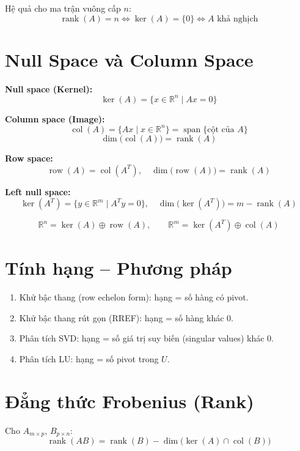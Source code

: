 Hệ quả cho ma trận vuông cấp $n$:
\[
\operatorname{rank}(A) = n \iff \ker(A) = \{0\} \iff A \text{ khả nghịch}
\]

\section{Null Space và Column Space}

\textbf{Null space (Kernel):}
\[
\ker(A) = \{x \in \mathbb{R}^n \mid Ax = 0\}
\]

\textbf{Column space (Image):}
\[
\operatorname{col}(A) = \{Ax \mid x \in \mathbb{R}^n\} = \operatorname{span}\{\text{cột của } A\}
\]
\[
\dim\bigl(\operatorname{col}(A)\bigr) = \operatorname{rank}(A)
\]

\textbf{Row space:}
\[
\operatorname{row}(A) = \operatorname{col}(A^T), \quad \dim\bigl(\operatorname{row}(A)\bigr) = \operatorname{rank}(A)
\]

\textbf{Left null space:}
\[
\ker(A^T) = \{y \in \mathbb{R}^m \mid A^T y = 0\}, \quad \dim\bigl(\ker(A^T)\bigr) = m - \operatorname{rank}(A)
\]

\[
\mathbb{R}^n = \ker(A) \oplus \operatorname{row}(A), \qquad
\mathbb{R}^m = \ker(A^T) \oplus \operatorname{col}(A)
\]

\section{Tính hạng -- Phương pháp}

\begin{enumerate}
    \item Khử bậc thang (row echelon form): hạng = số hàng có pivot.
    \item Khử bậc thang rút gọn (RREF): hạng = số hàng khác $0$.
    \item Phân tích SVD: hạng = số giá trị suy biến (singular values) khác $0$.
    \item Phân tích LU: hạng = số pivot trong $U$.
\end{enumerate}

\section{Đẳng thức Frobenius (Rank)}

Cho $A_{m \times p}$, $B_{p \times n}$:
\[
\operatorname{rank}(AB) = \operatorname{rank}(B) - \dim\bigl(\ker(A) \cap \operatorname{col}(B)\bigr)
\]

